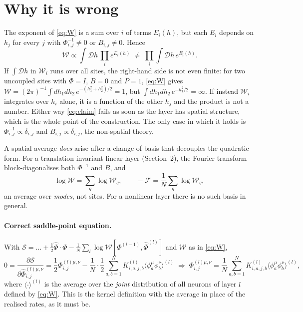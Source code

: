 \documentclass[11pt,a4paper]{article}
\newcommand{\D}{\mathcal D}
\newcommand{\W}{\mathcal W}
\newcommand{\F}{\mathcal F}
\newcommand{\Sact}{\mathcal S}
\begin{document}
\section{Why it is wrong}

The exponent of \eqref{eq:W} is a sum over $i$ of terms $E_i(h)$, but each
$E_i$ depends on $h_j$ for every $j$ with $\Phi^{-1}_{i,j}\neq0$ or
$B_{i,j}\neq0$. Hence
\begin{equation}
  \W \propto \int\D h\,\prod_i e^{E_i(h)}
  \;\neq\; \prod_i\int\D h\,e^{E_i(h)} .
\end{equation}
If $\int\D h$ in $\W_i$ runs over all sites, the right-hand side is not even
finite: for two uncoupled sites with $\Phi=I$, $B=0$ and $P=1$,
\eqref{eq:W} gives $\W = (2\pi)^{-1}\int dh_1dh_2\,e^{-(h_1^2+h_2^2)/2} = 1$, but
$\int dh_1dh_2\,e^{-h_1^2/2} = \infty$. If instead $\W_i$ integrates
over $h_i$ alone, it is a function of the other $h_j$ and the product is not a
number. Either way \eqref{eq:claim} fails as soon as the layer has spatial
structure, which is the whole point of the construction. The only case in
which it holds is $\Phi^{-1}_{i,j}\propto\delta_{i,j}$ and $B_{i,j}\propto\delta_{i,j}$,
the non-spatial theory.

A spatial average \emph{does} arise after a change of basis that decouples the
quadratic form. For a translation-invariant linear layer (Section~2), the
Fourier transform block-diagonalises both $\Phi^{-1}$ and $B$, and
\begin{equation}
  \log\W = \sum_q\log\W_q,\qquad -\F = \frac1N\sum_q\log\W_q,
\end{equation}
an average over \emph{modes}, not sites. For a nonlinear layer there is no such
basis in general.

\paragraph{Correct saddle-point equation.}
With $\Sact = \dots + \frac12\hat\Phi\cdot\Phi - \frac1N\sum_l\log\W[\Phi^{(l-1)},\hat\Phi^{(l)}]$
and $\W$ as in \eqref{eq:W},
\begin{equation}
  0 = \frac{\partial\Sact}{\partial\hat\Phi^{(l)\mu,\nu}_{i,j}}
  = \frac12\Phi^{(l)\mu,\nu}_{i,j}
   - \frac1N\cdot\frac12\sum_{a,b=1}^N K^{(l)}_{i,a,j,b}\langle\phi^\mu_a\phi^\nu_b\rangle^{(l)}
  \;\Longrightarrow\;
  \Phi^{(l)\mu,\nu}_{i,j} = \frac1N\sum_{a,b=1}^N K^{(l)}_{i,a,j,b}\langle\phi^\mu_a\phi^\nu_b\rangle^{(l)},
  \label{eq:forward}
\end{equation}
where $\langle\cdot\rangle^{(l)}$ is the average over the \emph{joint}
distribution of all neurons of layer $l$ defined by \eqref{eq:W}. This is the
kernel definition with the average in place of the realised rates, as it must
be.
\end{document}

